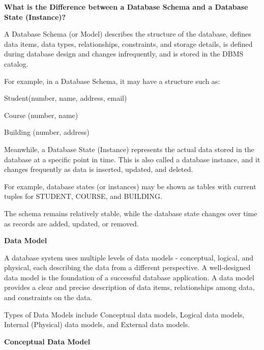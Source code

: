 \documentclass[11pt]{article}
\newenvironment{aside}
  {\begin{mdframed}[style=0,%
      leftline=false,rightline=false,leftmargin=2em,rightmargin=2em,%
          innerleftmargin=0pt,innerrightmargin=0pt,linewidth=0.75pt,%
      skipabove=7pt,skipbelow=7pt]\small}
  {\end{mdframed}}
\begin{document}
\vspace{11pt}
\textbf{What is the Difference between a Database Schema and a Database State (Instance)?}
\vspace{11pt}

A Database Schema (or Model) describes the structure of the database, defines data items, data types, relationships, constraints, and storage details, is defined during database design and changes infrequently, and is stored in the DBMS catalog.

For example, in a Database Schema, it may have a structure such as:

Student(number, name, address, email)

Course (number, name)

Building (number, address)

\vspace{11pt}
Meanwhile, a Database State (Instance) represents the actual data stored in the database at a specific point in time. This is also called a database instance, and it changes frequently as data is inserted, updated, and deleted.

For example, database states (or instances) may be shown as tables with current tuples for STUDENT, COURSE, and BUILDING.

\vspace{11pt}
\begin{aside}
The schema remains relatively stable, while the database state changes over time as records are added, updated, or removed.
\end{aside}
\vspace{11pt}

\vspace{11pt}
\textbf{Data Model}
\vspace{11pt}

A database system uses multiple levels of data models - conceptual, logical, and physical, each describing the data from a different perspective. A well-designed data model is the foundation of a successful database application. A data model provides a clear and precise description of data items, relationships among data, and constraints on the data.

Types of Data Models include Conceptual data models, Logical data models, Internal (Physical) data models, and External data models.

\vspace{11pt}
\textbf{Conceptual Data Model}
\vspace{11pt}
\end{document}
